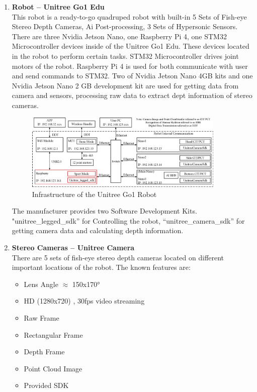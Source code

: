 \documentclass[12pt]{article}
\begin{document}
    \begin{enumerate}
        \item \textbf{Robot – Unitree Go1 Edu} \\
        This robot is a ready-to-go quadruped robot with built-in 5 Sets of Fish-eye Stereo Depth Cameras, Ai Post-processing, 3 Sets of Hypersonic Sensors. There are three Nvidia Jetson Nano, one Raspberry Pi 4, one STM32 Microcontroller devices inside of the Unitree Go1 Edu. These devices located in the robot to perform certain tasks. STM32 Microcontroller drives joint motors of the robot. Raspberry Pi 4 is used for both communicate with user and send commands to STM32. Two of Nvidia Jetson Nano 4GB kits and one Nvidia Jetson Nano 2 GB development kit are used for getting data from camera and sensors, processing raw data to extract dept information of stereo cameras.

        \begin{figure}[H]
            \centering
            \includegraphics[width=0.9\textwidth]{Go1CommFram_E.png}    
            \caption{Infrastructure of the Unitree Go1 Robot}
        \end{figure}

        The manufacturer provides two Software Development Kits. "unitree\_legged\_sdk” for Controlling the robot, “unitree\_camera\_sdk” for getting camera data and calculating depth information. 

        \item \textbf{Stereo Cameras – Unitree Camera } \\
        There are 5 sets of fish-eye stereo depth cameras located on different important locations of the robot. The known features are:

        \begin{itemize}
            \item Lens Angle $\approx$ 150x170° 
            \item HD (1280x720) , 30fps video streaming 
            \item Raw Frame 
            \item Rectangular Frame 
            \item Depth Frame 
            \item Point Cloud Image 
            \item Provided SDK 
        \end{itemize}
        

\end{enumerate}
\end{document}

